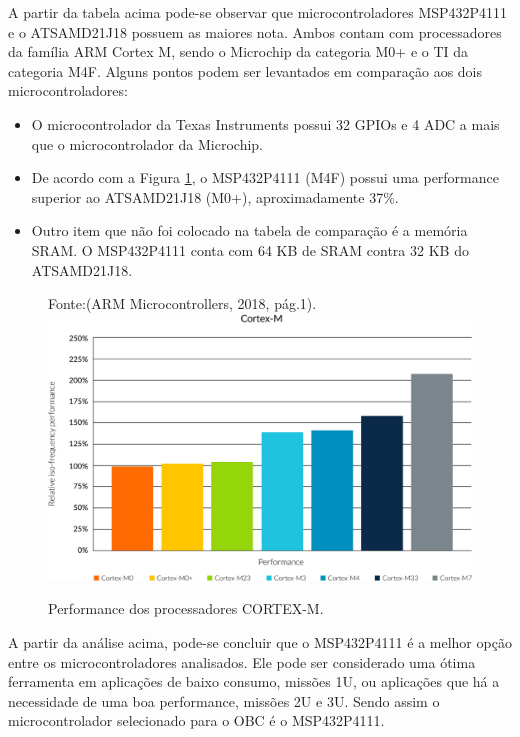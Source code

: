A partir da tabela acima pode-se observar que microcontroladores MSP432P4111 e o ATSAMD21J18 possuem as maiores nota. Ambos contam com processadores da família ARM Cortex M, sendo o Microchip da categoria M0+ e o TI da categoria M4F. Alguns pontos podem ser levantados em comparação aos dois microcontroladores:

\begin{itemize}
\item O microcontrolador da Texas Instruments possui 32 GPIOs e 4 ADC a mais que o microcontrolador da Microchip.

\item De acordo com a Figura \ref{fig18}, o MSP432P4111 (M4F) possui uma performance superior ao ATSAMD21J18 (M0+), aproximadamente 37\%.

\item Outro item que não foi colocado na tabela de comparação é a memória SRAM. O MSP432P4111 conta com 64 KB de SRAM contra 32 KB do ATSAMD21J18.

\end{itemize}


\begin{figure}[h]

    \centering
    Fonte:(ARM Microcontrollers, 2018, pág.1).
	\includegraphics[keepaspectratio=true,scale=0.4]{figuras/arm-cortex-m-series-performance-graph.jpg}
	\caption{ Performance dos processadores CORTEX-M.}
	\label{fig18}
\end{figure}

A partir da análise acima, pode-se concluir que o MSP432P4111 é a melhor opção entre os microcontroladores analisados. Ele pode ser considerado uma ótima ferramenta em aplicações de baixo consumo, missões 1U, ou aplicações que há a necessidade de uma boa performance, missões 2U e 3U. Sendo assim o microcontrolador selecionado para o OBC é o MSP432P4111.

